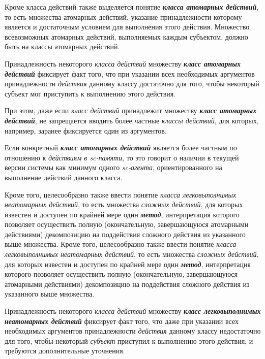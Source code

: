 Кроме класса действий также выделяется понятие \textbf{\textit{класса атомарных действий}}, то есть множества атомарных действий, указание принадлежности которому является  и достаточным условием для выполнения этого действия. Множество всевозможных атомарных действий, выполняемых каждым субъектом, должно быть  на классы атомарных действий.

Принадлежность некоторого \textit{класса действий} множеству \textbf{\textit{класс атомарных действий}} фиксирует факт того, что при указании всех необходимых аргументов принадлежности \textit{действия} данному классу достаточно для того, чтобы некоторый субъект мог приступить к выполнению этого действия.

При этом, даже если \textit{класс действий} принадлежит множеству \textbf{\textit{класс атомарных действий}}, не запрещается вводить более частные \textit{классы действий}, для которых, например, заранее фиксируется один из аргументов.

Если конкретный \textbf{\textit{класс атомарных действий}} является более частным по отношению к \textit{действиям в sc-памяти}, то это говорит о наличии в текущей версии системы как минимум одного \textit{sc-агента}, ориентированного на выполнение действий данного класса.

Кроме того, целесообразно также ввести понятие \textit{класса легковыполнимых неатомарных действий}, то есть множества \textit{сложных действий}, для которых известен и доступен по крайней мере один \textbf{\textit{метод}}, интерпретация которого позволяет осуществить полную (окончательную, завершающуюся атомарными действиями) декомпозицию на поддействия  сложного действия из указанного выше множества.
Кроме того, целесообразно также ввести понятие \textit{класса легковыполнимых неатомарных действий}, то есть множества \textit{сложных действий}, для которых известен и доступен по крайней мере один \textbf{\textit{метод}}, интерпретация которого позволяет осуществить полную (окончательную, завершающуюся атомарными действиями) декомпозицию на поддействия  сложного действия из указанного выше множества.

Принадлежность некоторого \textit{класса действий} множеству \textbf{\textit{класс легковыполнимых неатомарных действий}} фиксирует факт того, что даже при указании всех необходимых аргументов принадлежности \textit{действия} данному классу недостаточно для того, чтобы некоторый \textit{субъект} приступил к выполнению этого действия, и требуются дополнительные уточнения.

